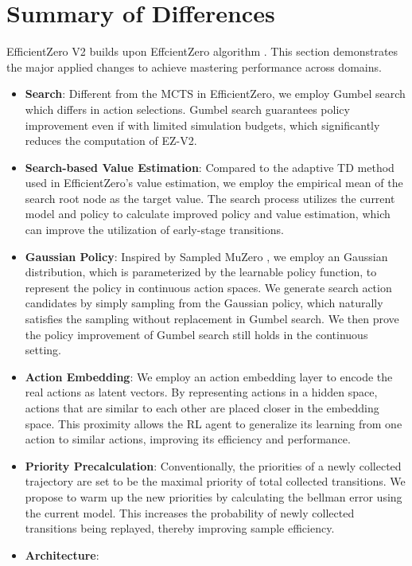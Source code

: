 \section{Summary of Differences}
\label{summary_diff}
EfficientZero V2 builds upon EffcientZero algorithm \citep{ye2021mastering}. This section demonstrates the major applied changes to achieve mastering performance across domains.
\begin{itemize}
    \item \textbf{Search}: Different from the MCTS in EfficientZero, we employ Gumbel search which differs in action selections. Gumbel search guarantees policy improvement even if with limited simulation budgets, which significantly reduces the computation of EZ-V2.
    \item \textbf{Search-based Value Estimation}: Compared to the adaptive TD method used in EfficientZero's value estimation, we employ the empirical mean of the search root node as the target value. The search process utilizes the current model and policy to calculate improved policy and value estimation, which can improve the utilization of early-stage transitions.
    \item \textbf{Gaussian Policy}: Inspired by Sampled MuZero \citep{hubert2021learning}, we employ an Gaussian distribution, which is parameterized by the learnable policy function, to represent the policy in continuous action spaces. We generate search action candidates by simply sampling from the Gaussian policy, which naturally satisfies the sampling without replacement in Gumbel search. We then prove the policy improvement of Gumbel search still holds in the continuous setting.
    \item \textbf{Action Embedding}: We employ an action embedding layer to encode the real actions as latent vectors. By representing actions in a hidden space, actions that are similar to each other are placed closer in the embedding space. This proximity allows the RL agent to generalize its learning from one action to similar actions, improving its efficiency and performance.
    \item \textbf{Priority Precalculation}: Conventionally, the priorities of a newly collected trajectory are set to be the maximal priority of total collected transitions. We propose to warm up the new priorities by calculating the bellman error using the current model. This increases the probability of newly collected transitions being replayed, thereby improving sample efficiency.
    \item \textbf{Architecture}:

\end{itemize}
